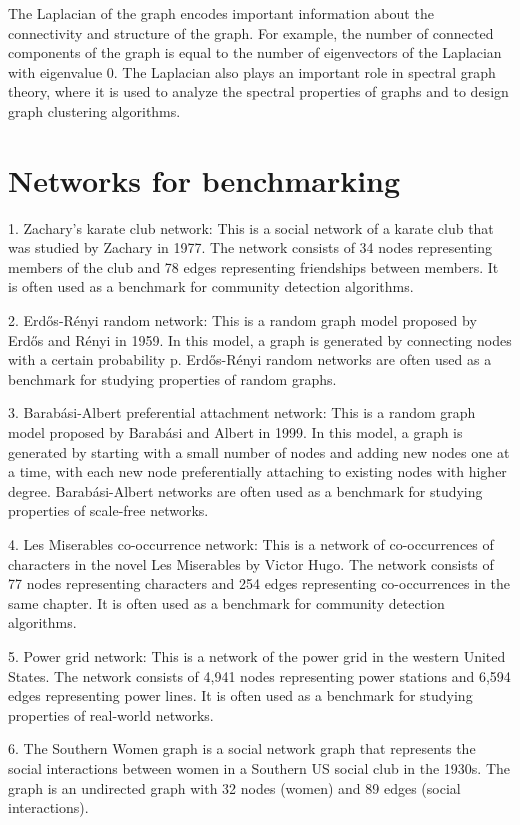 The Laplacian of the graph encodes important information about the connectivity and structure of the graph. For example, the number of connected components of the graph is equal to the number of eigenvectors of the Laplacian with eigenvalue 0. The Laplacian also plays an important role in spectral graph theory, where it is used to analyze the spectral properties of graphs and to design graph clustering algorithms.

\section{Networks for benchmarking}

1. Zachary's karate club network: This is a social network of a karate club that was studied by Zachary in 1977. The network consists of 34 nodes representing members of the club and 78 edges representing friendships between members. It is often used as a benchmark for community detection algorithms.

2. Erdős-Rényi random network: This is a random graph model proposed by Erdős and Rényi in 1959. In this model, a graph is generated by connecting nodes with a certain probability p. Erdős-Rényi random networks are often used as a benchmark for studying properties of random graphs.

3. Barabási-Albert preferential attachment network: This is a random graph model proposed by Barabási and Albert in 1999. In this model, a graph is generated by starting with a small number of nodes and adding new nodes one at a time, with each new node preferentially attaching to existing nodes with higher degree. Barabási-Albert networks are often used as a benchmark for studying properties of scale-free networks.

4. Les Miserables co-occurrence network: This is a network of co-occurrences of characters in the novel Les Miserables by Victor Hugo. The network consists of 77 nodes representing characters and 254 edges representing co-occurrences in the same chapter. It is often used as a benchmark for community detection algorithms.

5. Power grid network: This is a network of the power grid in the western United States. The network consists of 4,941 nodes representing power stations and 6,594 edges representing power lines. It is often used as a benchmark for studying properties of real-world networks.

6. The Southern Women graph is a social network graph that represents the social interactions between women in a Southern US social club in the 1930s. The graph is an undirected graph with 32 nodes (women) and 89 edges (social interactions).

